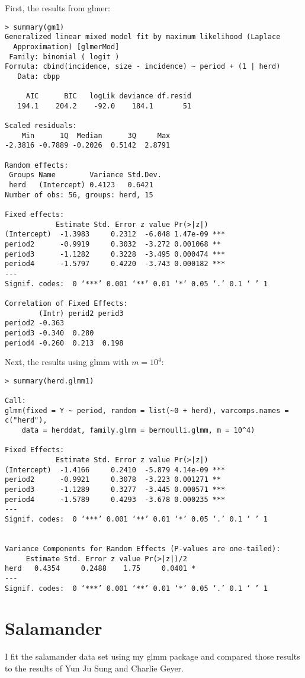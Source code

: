 \documentclass{article}
\begin{document}
First, the results from glmer:
\begin{verbatim}
> summary(gm1)
Generalized linear mixed model fit by maximum likelihood (Laplace
  Approximation) [glmerMod]
 Family: binomial ( logit )
Formula: cbind(incidence, size - incidence) ~ period + (1 | herd)
   Data: cbpp

     AIC      BIC   logLik deviance df.resid 
   194.1    204.2    -92.0    184.1       51 

Scaled residuals: 
    Min      1Q  Median      3Q     Max 
-2.3816 -0.7889 -0.2026  0.5142  2.8791 

Random effects:
 Groups Name        Variance Std.Dev.
 herd   (Intercept) 0.4123   0.6421  
Number of obs: 56, groups: herd, 15

Fixed effects:
            Estimate Std. Error z value Pr(>|z|)    
(Intercept)  -1.3983     0.2312  -6.048 1.47e-09 ***
period2      -0.9919     0.3032  -3.272 0.001068 ** 
period3      -1.1282     0.3228  -3.495 0.000474 ***
period4      -1.5797     0.4220  -3.743 0.000182 ***
---
Signif. codes:  0 ‘***’ 0.001 ‘**’ 0.01 ‘*’ 0.05 ‘.’ 0.1 ‘ ’ 1

Correlation of Fixed Effects:
        (Intr) perid2 perid3
period2 -0.363              
period3 -0.340  0.280       
period4 -0.260  0.213  0.198

\end{verbatim}

Next, the results using glmm with $m=10^4$:
\begin{verbatim}
> summary(herd.glmm1)

Call:
glmm(fixed = Y ~ period, random = list(~0 + herd), varcomps.names = c("herd"), 
    data = herddat, family.glmm = bernoulli.glmm, m = 10^4)

Fixed Effects:
            Estimate Std. Error z value Pr(>|z|)    
(Intercept)  -1.4166     0.2410  -5.879 4.14e-09 ***
period2      -0.9921     0.3078  -3.223 0.001271 ** 
period3      -1.1289     0.3277  -3.445 0.000571 ***
period4      -1.5789     0.4293  -3.678 0.000235 ***
---
Signif. codes:  0 ‘***’ 0.001 ‘**’ 0.01 ‘*’ 0.05 ‘.’ 0.1 ‘ ’ 1


Variance Components for Random Effects (P-values are one-tailed):
     Estimate Std. Error z value Pr(>|z|)/2  
herd   0.4354     0.2488    1.75     0.0401 *
---
Signif. codes:  0 ‘***’ 0.001 ‘**’ 0.01 ‘*’ 0.05 ‘.’ 0.1 ‘ ’ 1

\end{verbatim}


\section{Salamander}
I fit the salamander data set using  my glmm package and compared those results to the results of Yun Ju Sung and Charlie Geyer. 
\end{document}
